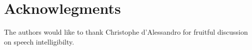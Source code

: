 \documentclass[final,3p,times,twocolumn]{elsarticle}
\begin{document}
\section{Acknowlegments}

The authors would like to thank Christophe d'Alessandro for fruitful discussion on speech intelligibilty.

\clearpage






\end{document}
